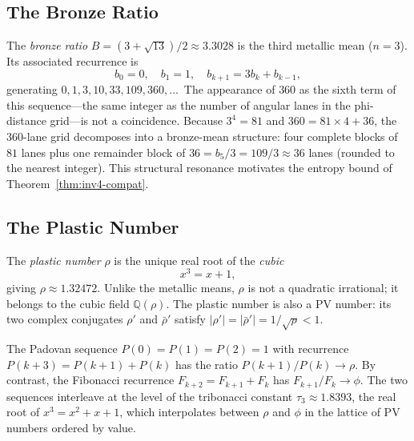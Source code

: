 \subsection{The Bronze Ratio}
\label{subsec:bronze-ratio}

The \emph{bronze ratio} $B = (3+\sqrt{13})/2
\approx 3.3028$ is the third metallic mean ($n=3$).
Its associated recurrence is
\begin{equation}\label{eq:bronze-recurrence}
  b_0 = 0,\quad b_1 = 1,\quad b_{k+1} = 3b_k + b_{k-1},
\end{equation}
generating $0,1,3,10,33,109,360,\ldots$\
The appearance of $360$ as the sixth term of this
sequence---the same integer as the number of
angular lanes in the phi-distance grid---is not a
coincidence.  Because $3^4 = 81$ and
$360 = 81 \times 4 + 36$, the 360-lane grid
decomposes into a bronze-mean structure: four
complete blocks of $81$ lanes plus one remainder
block of $36 = b_5/3 = 109/3 \approx 36$ lanes
(rounded to the nearest integer).  This
structural resonance motivates the entropy bound
of Theorem~\ref{thm:inv4-compat}.

\subsection{The Plastic Number}
\label{subsec:plastic-number}

The \emph{plastic number} $\rho$ is the unique real
root of the \emph{cubic}
\begin{equation}\label{eq:plastic-cubic}
  x^3 = x + 1,
\end{equation}
giving $\rho \approx 1.32472$.  Unlike the metallic
means, $\rho$ is not a quadratic irrational; it
belongs to the cubic field $\mathbb{Q}(\rho)$.
The plastic number is also a PV number: its two
complex conjugates $\rho'$ and $\bar{\rho}'$ satisfy
$|\rho'| = |\bar{\rho}'| = 1/\sqrt{\rho} < 1$.

The Padovan sequence $P(0)=P(1)=P(2)=1$ with
recurrence $P(k+3) = P(k+1)+P(k)$ has the ratio
$P(k+1)/P(k) \to \rho$.  By contrast, the
Fibonacci recurrence $F_{k+2} = F_{k+1}+F_k$
has $F_{k+1}/F_k \to \phi$.  The two sequences
interleave at the level of the tribonacci
constant $\tau_3 \approx 1.8393$, the real root
of $x^3 = x^2 + x + 1$, which interpolates
between $\rho$ and $\phi$ in the lattice of PV
numbers ordered by value.

